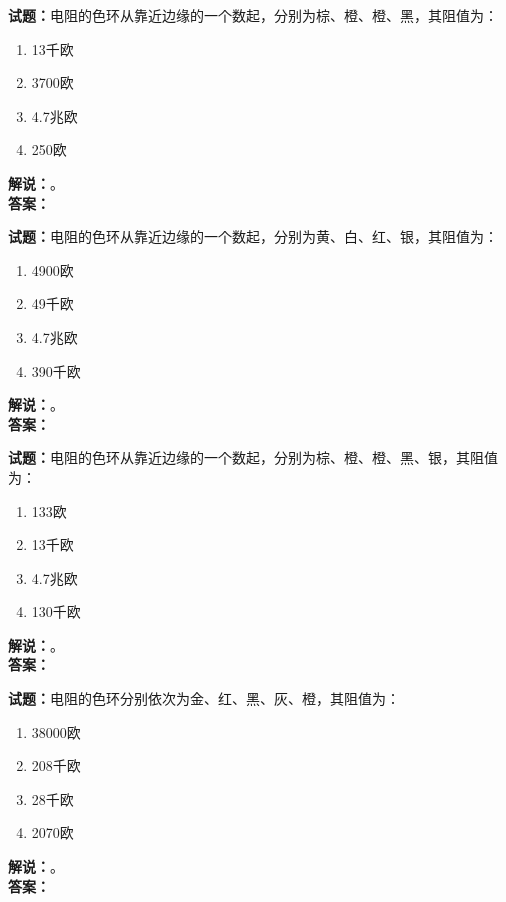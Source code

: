\documentclass{ctexbook}
\begin{document}
\bigskip




\noindent\textbf{试题：}电阻的色环从靠近边缘的一个数起，分别为棕、橙、橙、黑，其阻值为：
\begin{enumerate}[leftmargin=3em]
\item 13千欧
\item 3700欧
\item 4.7兆欧
\item 250欧
\end{enumerate}
\noindent\textbf{解说：}\textbf{}。\\\noindent\textbf{答案：}

\bigskip




\noindent\textbf{试题：}电阻的色环从靠近边缘的一个数起，分别为黄、白、红、银，其阻值为：
\begin{enumerate}[leftmargin=3em]
\item 4900欧
\item 49千欧
\item 4.7兆欧
\item 390千欧
\end{enumerate}
\noindent\textbf{解说：}\textbf{}。\\\noindent\textbf{答案：}

\bigskip




\noindent\textbf{试题：}电阻的色环从靠近边缘的一个数起，分别为棕、橙、橙、黑、银，其阻值为：
\begin{enumerate}[leftmargin=3em]
\item 133欧
\item 13千欧
\item 4.7兆欧
\item 130千欧
\end{enumerate}
\noindent\textbf{解说：}\textbf{}。\\\noindent\textbf{答案：}

\bigskip




\noindent\textbf{试题：}电阻的色环分别依次为金、红、黑、灰、橙，其阻值为：
\begin{enumerate}[leftmargin=3em]
\item 38000欧
\item 208千欧
\item 28千欧
\item 2070欧
\end{enumerate}
\noindent\textbf{解说：}\textbf{}。\\\noindent\textbf{答案：}
\end{document}
